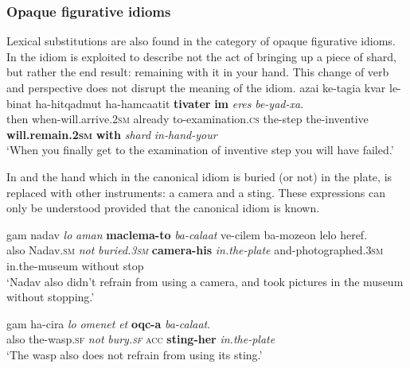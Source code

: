 \documentclass[output=paper]{langsci/langscibook}
\begin{document}
\subsubsection{Opaque figurative idioms}
Lexical substitutions are also found in the category of opaque figurative idioms.
In  the idiom is exploited to describe not the act of bringing up a piece of shard, but rather the end result: remaining with it in your hand. This change of verb and perspective does not disrupt the meaning of the idiom.
    \ea\label{she:xeres-sub}
        \gll {\alef}azai k{\shin}e-tagi{\ayin}a kvar le-b{\het}inat ha-hitqadmut ha-hamca{\alef}atit \textbf{tivater} \textbf{{\ayinB}im} \textit{{\het}eres} \textit{be-yad-xa}.\\
            then when-will.arrive.\textsc{2sm} already to-examination.\textsc{cs} the-step the-inventive \textbf{will.remain.\textsc{2sm}} \textbf{with} \textit{shard} \textit{in-hand-your}\\
        \glt `When you finally get to the examination of inventive step you will have failed.'
    \z

In  and  the hand which in the canonical idiom is buried (or not) in the plate, is replaced with other instruments: a camera and a sting. These expressions can only be understood provided that the canonical idiom is known.

    \ea\label{she:taman-sub-NP}
        \gll gam nadav \textit{lo} \textit{{\tet}aman} \textbf{maclema-to} \textit{ba-cala{\het}at} ve-cilem ba-moze{\alef}on lelo heref.\\
            also Nadav.\textsc{sm} \textit{not} \textit{buried.\textsc{3sm}} \textbf{camera-his} \textit{in.the-plate} and-photographed.\textsc{3sm} in.the-museum without stop\\
        \glt `Nadav also didn't refrain from using a camera, and took pictures in the museum without stopping.'
    \z

    \ea\label{she:taman-sub-PP}
        \gll gam ha-cir{\ayin}a \textit{lo} \textit{{\tet}omenet} \textit{{\alef}et} \textbf{{\ayinB}oqc-a} \textit{ba-cala{\het}at}.\\
            also the-wasp.\textsc{sf} \textit{not} \textit{bury.\textsc{sf}} \textsc{acc} \textbf{sting-her} \textit{in.the-plate}\\
        \glt `The wasp also does not refrain from using its sting.'
    \z
\end{document}
